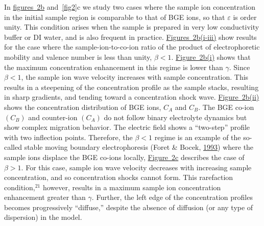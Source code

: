 \documentclass[lineno,authoryear]{FLO_v1}%
\theoremstyle{definition}
\begin{document}
In \hyperref[fig2]{figures~2b} and~\ref{fig2}c we study two
cases where the sample ion concentration in the initial
sample region is comparable to that of BGE ions, so that
$\varepsilon$ is order unity. This condition arises when
the sample is prepared in very low conductivity buffer or
DI water, and is also frequent in practice.
\hyperref[fig2]{Figures~2b(i-iii)} show results for the
case where the sample-ion-to-co-ion ratio of the product of
electrophoretic mobility and valence number is less than
unity, $\beta <1$. \hyperref[fig2]{Figure~2b(i)} shows that
the maximum concentration enhancement in this regime is
lower than $\gamma$. Since $\beta<1$, the sample ion wave
velocity increases with sample concentration. This results
in a steepening of the concentration profile as the sample
stacks, resulting in sharp gradients, and tending toward a
concentration shock wave. \hyperref[fig2]{Figure~2b(ii)}
shows the concentration distribution of BGE ions, $C_{A}$
and $C_{B}$. The BGE co-ion $(C_{B})$ and counter-ion
$(C_{A})$ do not follow binary electrolyte dynamics but
show complex migration behavior. The electric field shows a
``two-step'' profile with two inflection points. Therefore,
the $\beta <1$ regime is an example of the so-called stable
moving boundary electrophoresis (Foret \& Bocek, \hyperlink{bib8}{1993}) where the sample ions displace the
BGE co-ions locally, \hyperref[fig2]{Figure~2c} describes
the case of $\beta
>1$. For this case, sample ion wave velocity decreases with
increasing sample concentration, and so concentration
shocks cannot form. This rarefaction condition,$^{21}$
however, results in a maximum sample ion concentration
enhancement greater than $\gamma$. Further, the left edge
of the concentration profiles becomes progressively
``diffuse,'' despite the absence of diffusion (or any type
of dispersion) in the model.
\end{document}
